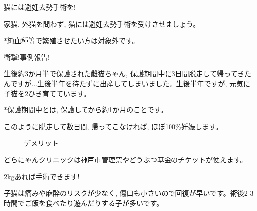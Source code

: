 \documentclass{jsarticle}
\begin{document}
\Huge
  猫には避妊去勢手術を!

\Large
  家猫, 外猫を問わず, 猫には避妊去勢手術を受けさせましょう。

  *純血種等で繁殖させたい方は対象外です。

  衝撃!事例報告!

  生後約3か月半で保護された雌猫ちゃん, 保護期間中に3日間脱走して帰ってきたんですが...生後半年を待たずに出産してしまいました。生後半年ですが, 元気に子猫を2ひき育てています。

  *保護期間中とは, 保護してから約1か月のことです。

	このように脱走して数日間, 帰ってこなければ, ほぼ100\%妊娠します。

	\begin{figure}[htbp]
		\centering
		\begin{minipage}{0.4\columnwidth}
		\end{minipage}
		\begin{minipage}{0.4\columnwidth}
			デメリット
		\end{minipage}
	\end{figure}

  どらにゃんクリニックは神戸市管理票やどうぶつ基金のチケットが使えます。




\newpage
\Huge
  2\si{\kilogram}あれば手術できます!

\Large
  子猫は痛みや麻酔のリスクが少なく, 傷口も小さいので回復が早いです。術後2-3時間でご飯を食べたり遊んだりする子が多いです。
\end{document}
